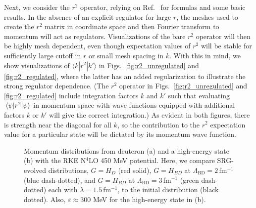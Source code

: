 \documentclass[10pt,aps,prc,floatfix,twocolumn,nofootinbib]{revtex4-1}
\newcommand{\LambdaBD}{{\Lambda_{\text{BD}}}}
\begin{document}
Next, we consider the $r^2$ operator, relying on Ref.~\cite{Anderson:2010aq} for formulas and some basic results.
In the absence of an explicit regulator for large $r$, the meshes used to create the $r^2$ matrix in coordinate space and then Fourier transform to momentum will act as regulators. 
Visualizations of the bare $r^2$ operator will then be highly mesh dependent, even though expectation values of $r^2$ will be stable for sufficiently large cutoff in $r$ or small mesh spacing in $k$.
With this in mind, we show visualizations of $\langle k | r^2 | k'\rangle$ in Figs.~\ref{fig:r2_unregulated} and \ref{fig:r2_regulated}, where the latter has an added regularization to illustrate the strong regulator dependence.
(The $r^2$ operator in Figs.~\ref{fig:r2_unregulated} and \ref{fig:r2_regulated} include integration factors $k$ and $k'$ such that evaluating $\mel{\psi}{r^2}{\psi}$ in momentum space with wave functions equipped with additional factors $k$ or $k'$ will give the correct integration.)
As evident in both figures, there is strength near the diagonal for all $k$, so the contribution to the $r^2$ expectation value for a particular state will be dictated by its momentum wave function.

%
\begin{figure}[tbh]
	\quad
	\caption{Momentum distributions from deuteron (a) and a high-energy state (b) with the RKE N$^4$LO 450 MeV potential. Here, we compare SRG-evolved distributions, $G=H_D$ (red solid), $G=H_{BD}$ at $\LambdaBD=2$\,fm$^{-1}$ (blue dash-dotted), and $G=H_{BD}$ at $\LambdaBD=3$\,fm$^{-1}$ (green dash-dotted) each with $\lambda=1.5$\,fm$^{-1}$, to the initial distribution (black dotted). Also, $\varepsilon \approx 300$ MeV for the high-energy state in (b).}
	\label{fig:momentum_distributions_RKE}
\end{figure}
%
\end{document}
